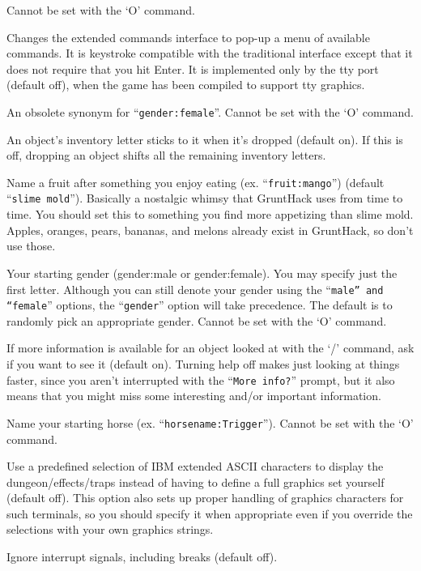 Cannot be set with the `O' command.
\item[\tb{extmenu}]
Changes the extended commands interface to pop-up a menu of available commands.  
It is keystroke compatible with the traditional interface except that it does
not require that you hit Enter. It is implemented only by the tty port 
(default off), when the game has been compiled to support tty graphics.
\item[\tb{female}]
An obsolete synonym for ``{\tt gender:female}''.
Cannot be set with the `O' command.
\item[\tb{fixinv}]
An object's inventory letter sticks to it when it's dropped (default on).
If this is off, dropping an object shifts all the remaining inventory letters.
\item[\tb{``fruit   ''}]
Name a fruit after something you enjoy eating (ex. ``{\tt fruit:mango}'')
(default ``{\tt slime mold}'').  Basically a nostalgic whimsy that GruntHack uses
from time to time.  You should set this to something you find more
appetizing than slime mold.  Apples, oranges, pears, bananas, and melons
already exist in GruntHack, so don't use those.
\item[\tb{gender}]
Your starting gender (gender:male or gender:female).
You may specify just the first letter.  Although you can
still denote your gender using the ``{\tt male'' and ``female}''
options, the ``{\tt gender}'' option will take precedence.
The default is to randomly pick an appropriate gender.
Cannot be set with the `O' command.
\item[\tb{help}]
If more information is available for an object looked at
with the `/' command, ask if you want to see it (default on). Turning help
off makes just looking at things faster, since you aren't interrupted with the
``{\tt More info?}'' prompt, but it also means that you might miss some
interesting and/or important information.
\item[\tb{horsename}]
Name your starting horse (ex. ``{\tt horsename:Trigger}'').
Cannot be set with the `O' command.
\item[\tb{IBMgraphics}]
Use a predefined selection of IBM extended ASCII characters to display the
dungeon/effects/traps instead of having to define a full graphics set
yourself (default off).
This option also sets up proper handling of graphics
characters for such terminals, so you should specify it when appropriate
even if you override the selections with your own graphics strings.
\item[\tb{ignintr}]
Ignore interrupt signals, including breaks (default off).
